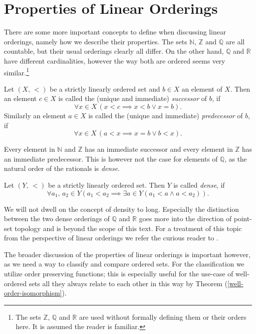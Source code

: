 \documentclass[../../main.tex]{subfiles}
\begin{document}
\section{Properties of Linear Orderings}

There are some more important concepts to define when discussing linear orderings, namely how we describe their properties.
The sets $\mathbb{N}$, $\mathbb{Z}$ and $\mathbb{Q}$ are all countable, but their usual orderings clearly all differ.
On the other hand, $\mathbb{Q}$ and $\mathbb{R}$ have different cardinalities, 
however the way both are ordered seems very similar.\footnote{The sets $\mathbb{Z}$, $\mathbb{Q}$ and $\mathbb{R}$ are used without formally defining them or their orders here.
It is assumed the reader is familiar.}

\begin{definition}\cite[Definition 1.20]{Ros82}
    Let $(X,\, <)$ be a strictly linearly ordered set and $b \in X$ an element of $X$.
    Then an element $c \in X$ is called the (unique and immediate) \textit{successor} of $b$, if
    $$\forall x \in X \, \left(x < c \implies x < b \vee x = b\right).$$
    Similarly an element $a \in X$ is called the (unique and immediate) \textit{predecessor} of $b$, if
    $$\forall x \in X \, \left(a < x \implies x = b \vee b < x\right).$$
\end{definition}
Every element in $\mathbb{N}$ and $\mathbb{Z}$ has an immediate successor and every element in $\mathbb{Z}$ has an immediate predecessor.
This is however not the case for elements of $\mathbb{Q}$, as the natural order of the rationals is \textit{dense}.

\begin{definition}\cite[Definition 2.1]{Ros82}
    Let $(Y,\, <)$ be a strictly linearly ordered set.
    Then $Y$ is called \textit{dense}, if
    $$\forall a_1,\, a_2 \in Y \left(a_1 < a_2 \implies \exists a \in Y \left(a_1 < a \wedge a < a_2\right)\right).$$
\end{definition}

We will not dwell on the concept of density to long.
Especially the distinction between the two dense orderings of $\mathbb{Q}$ and $\mathbb{R}$ goes more into the direction of point-set topology and is beyond the scope of this text.
For a treatment of this topic from the perspective of linear orderings we refer the curious reader to \cite[\S 2]{Ros82}.

The broader discussion of the properties of linear orderings is important however, as we need a way to classify and compare ordered sets.
For the classification we utilize order preserving functions; this is especially useful for the use-case of well-ordered sets all they always relate to each other in this way by Theorem (\ref{well-order-isomorphism}).
\end{document}

